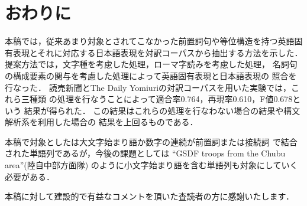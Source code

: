 \section{おわりに}

本稿では，従来あまり対象とされてこなかった前置詞句や等位構造を持つ英語固
有表現とそれに対応する日本語表現を対訳コーパスから抽出する方法を示した．
提案方法では，文字種を考慮した処理，ローマ字読みを考慮した処理，
名詞句の構成要素の関与を考慮した処理によって英語固有表現と日本語表現の
照合を行なった．
読売新聞とThe Daily Yomiuriの対訳コーパスを用いた実験では，これら三種類
の処理を行なうことによって適合率0.764，再現率0.610，F値0.678という
結果が得られた．
この結果はこれらの処理を行なわない場合の結果や構文解析系を利用した場合の
結果を上回るものである．

本稿で対象とした{\CPNP}は大文字始まり語か数字の連続が前置詞または接続詞
で結合された単語列であるが，今後の課題としては
``GSDF troops from the Chubu area''(陸自中部方面隊)
のように小文字始まり語を含む単語列も対象にしていく必要がある．

\acknowledgment
本稿に対して建設的で有益なコメントを頂いた査読者の方に感謝いたします． 

